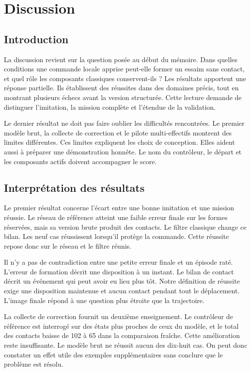 \chapter*{Discussion}
{}

\section*{Introduction}
{}
La discussion revient sur la question posée au début du mémoire. Dans quelles conditions une commande locale apprise peut-elle former un essaim sans contact, et quel rôle les composants classiques conservent-ils ? Les résultats apportent une réponse partielle. Ils établissent des réussites dans des domaines précis, tout en montrant plusieurs échecs avant la version structurée. Cette lecture demande de distinguer l'imitation, la mission complète et l'étendue de la validation.

Le dernier résultat ne doit pas faire oublier les difficultés rencontrées. Le premier modèle brut, la collecte de correction et le pilote multi-effectifs montrent des limites différentes. Ces limites expliquent les choix de conception. Elles aident aussi à préparer une démonstration honnête. Le nom du contrôleur, le départ et les composants actifs doivent accompagner le score.

\section*{Interprétation des résultats}
{}
Le premier résultat concerne l'écart entre une bonne imitation et une mission réussie. Le réseau de référence atteint une faible erreur finale sur les formes réservées, mais sa version brute produit des contacts. Le filtre classique change ce bilan. Les neuf cas réussissent lorsqu'il protège la commande. Cette réussite repose donc sur le réseau et le filtre réunis.

Il n'y a pas de contradiction entre une petite erreur finale et un épisode raté. L'erreur de formation décrit une disposition à un instant. Le bilan de contact décrit un événement qui peut avoir eu lieu plus tôt. Notre définition de réussite exige une disposition maintenue et aucun contact pendant tout le déplacement. L'image finale répond à une question plus étroite que la trajectoire.

La collecte de correction fournit un deuxième enseignement. Le contrôleur de référence est interrogé sur des états plus proches de ceux du modèle, et le total des contacts baisse de 102 à 65 dans la comparaison fraîche. Cette amélioration reste insuffisante. Le modèle brut ne réussit aucun des dix-huit cas. On peut donc constater un effet utile des exemples supplémentaires sans conclure que le problème est résolu.

